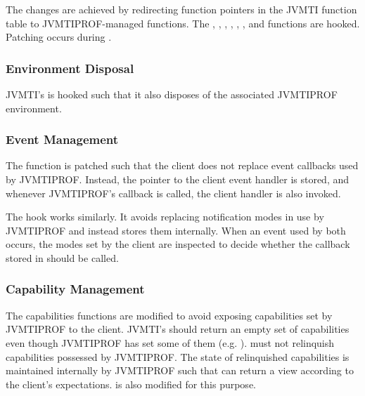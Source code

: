 The changes are achieved by redirecting function pointers in the JVMTI function table to JVMTIPROF-managed functions. The , , , , , ,  and  functions are hooked. Patching occurs during .

\subsubsection*{Environment Disposal}

JVMTI's  is hooked such that it also disposes of the associated JVMTIPROF environment.

\subsubsection*{Event Management}

The  function is patched such that the client does not replace event callbacks used by JVMTIPROF. Instead, the pointer to the client event handler is stored, and whenever JVMTIPROF's callback is called, the client handler is also invoked.

The  hook works similarly. It avoids replacing notification modes in use by JVMTIPROF and instead stores them internally. When an event used by both occurs, the modes set by the client are inspected to decide whether the callback stored in  should be called.

\subsubsection*{Capability Management}

The capabilities functions are modified to avoid exposing capabilities set by JVMTIPROF to the client. JVMTI's  should return an empty set of capabilities even though JVMTIPROF has set some of them (e.g. ).  must not relinquish capabilities possessed by JVMTIPROF. The state of relinquished capabilities is maintained internally by JVMTIPROF such that  can return a view according to the client's expectations.  is also modified for this purpose.

